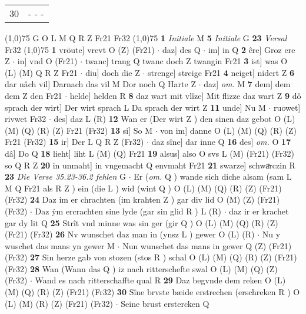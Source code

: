 \documentclass[8pt,a4paper,notitlepage]{article}
\begin{document}
\begin{table}[ht]
\begin{minipage}[t]{0.5\linewidth}
\begin{tabular}{rl}
30 & \multicolumn{1}{l}{ - - - }\\ 
\end{tabular}
\scriptsize
\line(1,0){75} \newline
G O L M Q R Z Fr21 Fr32 \newline
\line(1,0){75} \newline
\textbf{1} \textit{Initiale} M  \textbf{5} \textit{Initiale} G  \textbf{23} \textit{Versal} Fr32  \newline
\line(1,0){75} \newline
\textbf{1} vröute] vrevt O (Z) (Fr21)  $\cdot$ daz] des Q  $\cdot$ im] in Q \textbf{2} êre] Groz ere Z  $\cdot$ in] vnd O (Fr21)  $\cdot$ twanc] trang Q twanc doch Z twangin Fr21 \textbf{3} ist] was O (L) (M) Q R Z Fr21  $\cdot$ diu] doch die Z  $\cdot$ strenge] streige Fr21 \textbf{4} neiget] nidert Z \textbf{6} dar nâch vil] Darnach das vil M Dor noch Q Harte Z  $\cdot$ daz] \textit{om.} M \textbf{7} dem] dem dem Z den Fr21  $\cdot$ helde] helden R \textbf{8} daz wart mit vlîze] Mit flizze daz wart Z \textbf{9} dô sprach der wirt] Der wirt sprach L Da sprach der wirt Z \textbf{11} unde] Nu M  $\cdot$ ruowet] rivwet Fr32  $\cdot$ des] daz L (R) \textbf{12} Wan er (Der wirt Z ) den sinen daz gebot O (L) (M) (Q) (R) (Z) Fr21 (Fr32) \textbf{13} si] So M  $\cdot$ von im] danne O (L) (M) (Q) (R) (Z) Fr21 (Fr32) \textbf{15} ir] Der L Q R Z (Fr32)  $\cdot$ daz sîne] dar inne Q \textbf{16} des] \textit{om.} O \textbf{17} dâ] Do Q \textbf{18} lieht] liht L (M) (Q) Fr21 \textbf{19} alsus] also O svs L (M) (Fr21) (Fr32) so Q R Z \textbf{20} in unmaht] in vngemacht Q envmaht Fr21 \textbf{21} swarze] schwaͯrczin R \textbf{23} \textit{Die Verse 35.23-36.2 fehlen} G   $\cdot$ Er (\textit{om.} Q ) wande sich diche alsam (sam L M Q Fr21 als R Z ) ein (die L ) wid (wint Q ) O (L) (M) (Q) (R) (Z) (Fr21) (Fr32) \textbf{24} Daz im er chrachten (im krahten Z ) gar div lid O (M) (Z) (Fr21) (Fr32)  $\cdot$ Daz ẏm ercrachten sine lyde (gar sin glid R ) L (R)  $\cdot$ daz ir er krachet gar dy lit Q \textbf{25} Strît vnd minne was sin ger (gir Q ) O (L) (M) (Q) (R) (Z) (Fr21) (Fr32) \textbf{26} Nv wunschet daz man in (ynsz L ) gewer O (L) (R)  $\cdot$ Nu y wuschet das mans yn gewer M  $\cdot$ Nun wunschet das mans in gewer Q (Z) (Fr21) (Fr32) \textbf{27} Sin herze gab von stozen (stos R ) schal O (L) (M) (Q) (R) (Z) (Fr21) (Fr32) \textbf{28} Wan (Wann das Q ) iz nach ritterschefte swal O (L) (M) (Q) (Z) (Fr32)  $\cdot$ Wand es nach ritterschaffte qual R \textbf{29} Daz begvnde dem reken O (L) (M) (Q) (R) (Z) (Fr21) (Fr32) \textbf{30} Sîne brvste bæide erstrechen (erschreken R ) O (L) (M) (R) (Z) (Fr21) (Fr32)  $\cdot$ Seine brust erstercken Q \newline

\end{minipage}
\end{table}
\end{document}
